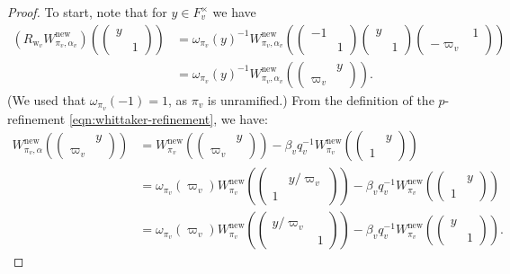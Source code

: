 \documentclass[10pt, twoside]{amsart}
\theoremstyle{plain}
\theoremstyle{definition}
\theoremstyle{remark}
\numberwithin{equation}{subsection}
\def\new{\mathrm{new}}
\begin{document}
\begin{proof}
To start, note that for $y \in F_v^\times$ we have
\begin{align*}
(R_{{ \boldsymbol{\mathrm{w}}}_v}W_{\pi_v,\alpha_v}^{\new})\left(\begin{pmatrix} y \\ & 1 \end{pmatrix}\right) &= \omega_{\pi_v}(y)^{-1} W_{\pi_v,\alpha_v}^{\new}\left(\begin{pmatrix} -1 \\ & 1 \end{pmatrix}\begin{pmatrix} y \\ & 1 \end{pmatrix}\begin{pmatrix} & 1 \\ -\varpi_v &  \end{pmatrix}\right)\\
&= \omega_{\pi_v}(y)^{-1} W_{\pi_v,\alpha_v}^{\new}\left(\begin{pmatrix} & y \\ \varpi_v \end{pmatrix}\right).
\end{align*}
(We used that $\omega_{\pi_v}(-1) = 1$, as $\pi_v$ is unramified.) From the definition of the $p$-refinement \eqref{eqn:whittaker-refinement}, we have:
\begin{align*}
W_{\pi_v,\alpha}^{\new}\left(\begin{pmatrix} & y \\ \varpi_v \end{pmatrix}\right) &= W_{\pi_v}^{\new}\left(\begin{pmatrix} & y \\ \varpi_v \end{pmatrix}\right) - \beta_vq_v^{-1}W_{\pi_v}^{\new}\left(\begin{pmatrix}  & y \\ 1 \end{pmatrix}\right)\\
&= \omega_{\pi_v}(\varpi_v)W_{\pi_v}^{\new}\left(\begin{pmatrix} & y/\varpi_v \\ 1 \end{pmatrix} \right) - \beta_vq_v^{-1}W_{\pi_v}^{\new}\left(\begin{pmatrix}  & y \\ 1 \end{pmatrix}\right)\\
&= \omega_{\pi_v}(\varpi_v)W_{\pi_v}^{\new}\left(\begin{pmatrix} y/\varpi_v & \\ & 1 \end{pmatrix} \right) - \beta_vq_v^{-1}W_{\pi_v}^{\new}\left(\begin{pmatrix} y &  \\ & 1 \end{pmatrix}\right).

\end{align*}
\end{proof}
\end{document}
